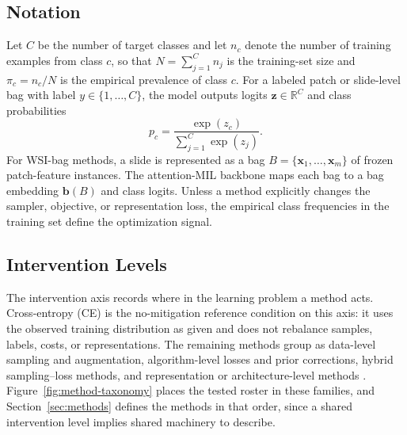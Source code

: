 \documentclass[11pt]{article}
\begin{document}
\subsection{Notation}
Let $C$ be the number of target classes and let $n_c$ denote the number of training examples from class $c$, so that $N=\sum_{j=1}^{C}n_j$ is the training-set size and $\pi_c=n_c/N$ is the empirical prevalence of class $c$. For a labeled patch or slide-level bag with label $y\in\{1,\ldots,C\}$, the model outputs logits $\mathbf{z}\in\mathbb{R}^{C}$ and class probabilities
\begin{equation}
  p_c = \frac{\exp(z_c)}{\sum_{j=1}^{C}\exp(z_j)}.
  \label{eq:softmax}
\end{equation}
For WSI-bag methods, a slide is represented as a bag $B=\{\mathbf{x}_1,\ldots,\mathbf{x}_m\}$ of frozen patch-feature instances. The attention-MIL backbone maps each bag to a bag embedding $\mathbf{b}(B)$ and class logits. Unless a method explicitly changes the sampler, objective, or representation loss, the empirical class frequencies in the training set define the optimization signal.

\subsection{Intervention Levels}
\label{sec:intervention-axis}
The intervention axis records where in the learning problem a method acts. Cross-entropy (CE) is the no-mitigation reference condition on this axis: it uses the observed training distribution as given and does not rebalance samples, labels, costs, or representations. The remaining methods group as data-level sampling and augmentation, algorithm-level losses and prior corrections, hybrid sampling--loss methods, and representation or architecture-level methods \citep{saini2023tacklingClass,zhang2023deepLong}. Figure~\ref{fig:method-taxonomy} places the tested roster in these families, and Section~\ref{sec:methods} defines the methods in that order, since a shared intervention level implies shared machinery to describe.
\end{document}
